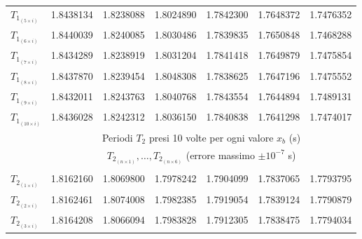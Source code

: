\begin{table*}[t!]
\begin{tabular}{l*{6}{c}}
        $T_{1_{(5 \times i)}}$                                                & 1.8438134 & 1.8238088          & 1.8024890          & 1.7842300 & 1.7648372 & 1.7476352                  \\[+0.5ex]
        $T_{1_{(6 \times i)}}$                                                & 1.8440039 & 1.8240085          & 1.8030486          & 1.7839835 & 1.7650848 & 1.7468288                  \\[+0.5ex]
        $T_{1_{(7 \times i)}}$                                                & 1.8434289 & 1.8238919          & 1.8031204          & 1.7841418 & 1.7649879 & 1.7475854                  \\[+0.5ex]
        $T_{1_{(8 \times i)}}$                                                & 1.8437870 & 1.8239454          & 1.8048308          & 1.7838625 & 1.7647196 & 1.7475552                  \\[+0.5ex]
        $T_{1_{(9 \times i)}}$                                                & 1.8432011 & 1.8243763          & 1.8040768          & 1.7843554 & 1.7644894 & 1.7489131                  \\[+0.5ex]
        $T_{1_{(10\times i)}}$                                                & 1.8436028 & 1.8242312          & 1.8036150          & 1.7840838 & 1.7641298 & 1.7474017                  \\[+0.5ex]
                                                                              & \multicolumn{6}{c}{Periodi $T_2$ presi 10 volte per ogni valore $x_b$ (s)}                               \\[+0.5ex]
                                                                              & \multicolumn{6}{c}{$T_{2_{(n \times 1)}}, \ldots, T_{2_{(n \times 6)}}$ (errore massimo $\pm10^{-7}$ s)} \\[+0.5ex] \hline \\[-1.5ex]
        $T_{2_{(1 \times i)}}$                                                & 1.8162160 & 1.8069800          & 1.7978242          & 1.7904099 & 1.7837065 & 1.7793795                  \\[+0.5ex]
        $T_{2_{(2 \times i)}}$                                                & 1.8162461 & 1.8074008          & 1.7982385          & 1.7919054 & 1.7839124 & 1.7790879                  \\[+0.5ex]
        $T_{2_{(3 \times i)}}$                                                & 1.8164208 & 1.8066094          & 1.7983828          & 1.7912305 & 1.7838475 & 1.7794034                  \\[+0.5ex]

\end{tabular}
\end{table*}
